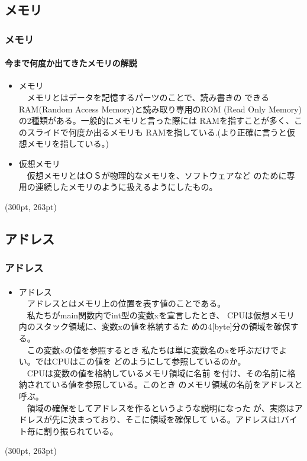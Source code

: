 \documentclass[dvipdfmx]{beamer}
\begin{document}
\subsection{メモリ}
\begin{frame}[t, fragile, label=61]
    \frametitle{メモリ}
    \framesubtitle{今まで何度か出てきたメモリの解説}
    \begin{itemize}
        \item メモリ\\
        　メモリとはデータを記憶するパーツのことで、読み書きの
        できるRAM(Random Access Memory)と読み取り専用のROM
        (Read Only Memory)の2種類がある。一般的にメモリと言った際には
        RAMを指すことが多く、このスライドで何度か出るメモリも
        RAMを指している.(より正確に言うと仮想メモリを指している。)
        \item 仮想メモリ\\
        　仮想メモリとはＯＳが物理的なメモリを、ソフトウェアなど
        のために専用の連続したメモリのように扱えるようにしたもの。
    \end{itemize}
    \begin{textblock*}{0.3\linewidth}(300pt, 263pt)
        \hyperlink{61}{}
        \space
        \hyperlink{63}{}
    \end{textblock*}
\end{frame}

\subsection{アドレス}
\begin{frame}[t, fragile, label=63]
    \frametitle{アドレス}
    \framesubtitle{}
    \begin{itemize}
        \item アドレス\\
            　アドレスとはメモリ上の位置を表す値のことである。\\
             　私たちがmain関数内でint型の変数xを宣言したとき、
             CPUは仮想メモリ内のスタック領域に、変数xの値を格納するた
             めの4[byte]分の領域を確保する。\\
             　この変数xの値を参照するとき
             私たちは単に変数名のxを呼ぶだけでよい。ではCPUはこの値を
             どのようにして参照しているのか。\\
             　CPUは変数の値を格納しているメモリ領域に名前
             を付け、その名前に格納されている値を参照している。このとき
             のメモリ領域の名前をアドレスと呼ぶ。\\
             　領域の確保をしてアドレスを作るというような説明になった
             が、実際はアドレスが先に決まっており、そこに領域を確保して
             いる。アドレスは1バイト毎に割り振られている。
    \end{itemize}
    \begin{textblock*}{0.3\linewidth}(300pt, 263pt)
        \hyperlink{62}{}
        \space
        \hyperlink{64}{}
    \end{textblock*}
\end{frame}
\end{document}
